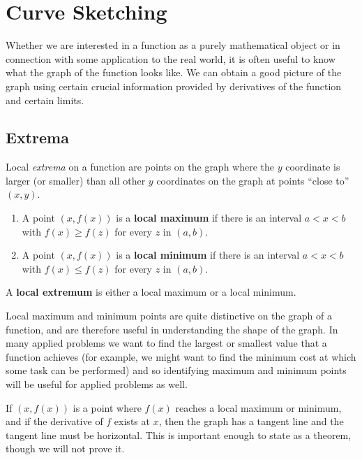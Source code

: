 \chapter{Curve Sketching}



Whether we are interested in a function as a purely mathematical
object or in connection with some application to the real world, it is
often useful to know what the graph of the function looks like. We can
obtain a good picture of the graph using certain crucial information
provided by derivatives of the function and certain limits.

\section{Extrema}

Local \textit{extrema} on a function are points on the graph where the
$y$ coordinate is larger (or smaller) than all other $y$ coordinates
on the graph at points ``close to'' $(x,y)$. 

\begin{definition}\hfil{}
\begin{enumerate}
\item A point $(x,f(x))$ is a \textbf{local maximum} if there is an interval $a<x<b$ with $f(x)\ge f(z)$ for
  every $z$ in $(a,b)$.
\item A point $(x,f(x))$ is a \textbf{local minimum} if
  there is an interval $a<x<b$ with $f(x)\le f(z)$ for every $z$ in
  $(a,b)$.
\end{enumerate}
A \textbf{local extremum} is either a local
maximum or a local minimum.
\end{definition}

Local maximum and minimum points are quite distinctive on the graph of
a function, and are therefore useful in understanding the shape of the
graph. In many applied problems we want to find the largest or
smallest value that a function achieves (for example, we might want
to find the minimum cost at which some task can be performed) and so
identifying maximum and minimum points will be useful for applied
problems as well.

If $(x,f(x))$ is a point where $f(x)$ reaches a local maximum or minimum,
and if the derivative of $f$ exists at $x$, then the graph has a
tangent line and the tangent line must be horizontal. This is
important enough to state as a theorem, though we will not prove it.


